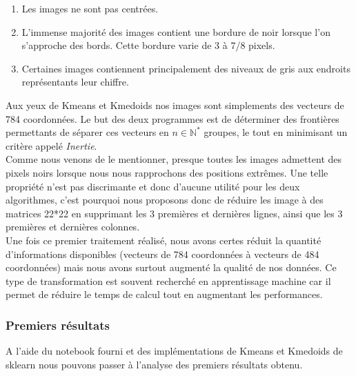 \documentclass{article}
\begin{document}
\begin{enumerate}
    \item Les images ne sont pas centrées.
    \item L'immense majorité des images contient une bordure de noir lorsque l'on s'approche des bords. Cette bordure varie de 3 à 7/8 pixels.
    \item Certaines images contiennent principalement des niveaux de gris aux endroits représentants leur chiffre.
\end{enumerate}

Aux yeux de Kmeans et Kmedoids nos images sont simplements des vecteurs de 784 coordonnées. Le but des deux programmes est de déterminer des frontières permettants de séparer ces vecteurs en $n \in \mathbb{N}^*$ groupes, le tout en minimisant un critère appelé \textit{Inertie}. 
\\
Comme nous venons de le mentionner, presque toutes les images admettent des pixels noirs lorsque nous nous rapprochons des positions extrêmes. Une telle propriété n'est pas discrimante et donc d'aucune utilité pour les deux algorithmes, c'est pourquoi nous proposons donc de réduire les image à des matrices 22*22 en supprimant les 3 premières et dernières lignes, ainsi que les 3 premières et dernières colonnes. \\

Une fois ce premier traitement réalisé, nous avons certes réduit la quantité d'informations disponibles (vecteurs de 784 coordonnées à vecteurs de 484 coordonnées) mais nous avons surtout augmenté la qualité de nos données. Ce type de transformation est souvent recherché en apprentissage machine car il permet de réduire le temps de calcul tout en augmentant les performances. 

\newpage

\subsubsection{Premiers résultats}

A l'aide du notebook fourni et des implémentations de Kmeans et Kmedoids de sklearn nous pouvons passer à l'analyse des premiers résultats obtenu.

\end{document}

